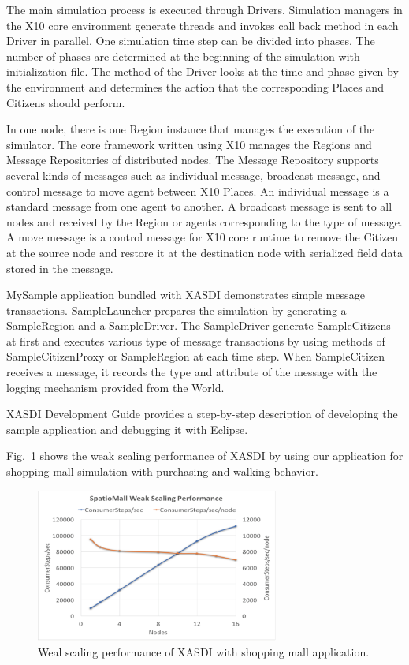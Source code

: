 The main simulation process is executed through Drivers.
Simulation managers in the X10 core environment generate threads and invokes call back method in each Driver in parallel.
One simulation time step can be divided into phases. The number of phases are determined at the beginning of the simulation with initialization file.
The method of the Driver looks at the time and phase given by the environment and determines the action that the corresponding Places and Citizens should perform.


In one node, there is one Region instance that manages the execution of the simulator.
The core framework written using X10 manages the Regions and Message Repositories of distributed nodes.
The Message Repository supports several kinds of messages such as individual message, broadcast message, and control message to move agent between X10 Places.
An individual message is a standard message from one agent to another.
A broadcast message is sent to all nodes and received by the Region or agents corresponding to the type of message.
A move message is a control message for X10 core runtime to remove the Citizen at the source node and restore it at the destination node with serialized field data stored in the message.

MySample application bundled with XASDI demonstrates simple message transactions.
SampleLauncher prepares the simulation by generating a SampleRegion and a SampleDriver.
The SampleDriver generate SampleCitizens at first and executes various type of message transactions by using methods of SampleCitizenProxy or SampleRegion at each time step.
When SampleCitizen receives a message, it records the type and attribute of the message with the logging mechanism provided from the World.

XASDI Development Guide provides a step-by-step description of developing the sample application and debugging it with Eclipse.

Fig.~\ref{fig:Figs.mizuta/xasdiscaling} shows the weak scaling performance of XASDI by using our application for shopping mall simulation with purchasing and walking behavior.
\begin{figure}[h]
  \centering
  \includegraphics[width=8cm]{Figs.mizuta/xasdiscaling.png}
  \caption{Weal scaling performance of XASDI with shopping mall application.}
  \label{fig:Figs.mizuta/xasdiscaling}
\end{figure}
